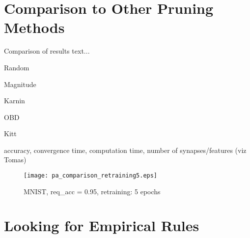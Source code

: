 \section{Comparison to Other Pruning Methods} \label{sec:comparison_of_pruning_methods}
Comparison of results text...

Random

Magnitude

Karnin

OBD

Kitt

accuracy, convergence time, computation time, number of synapses/features (viz Tomas)

\begin{figure}[H]
\centering
\texttt{[image: pa\_comparison\_retraining5.eps]}
\caption{MNIST, req\_acc = 0.95, retraining: 5 epochs}
\label{fig:discussion:pa_comparison_retraining5}
\end{figure}

\section{Looking for Empirical Rules}
